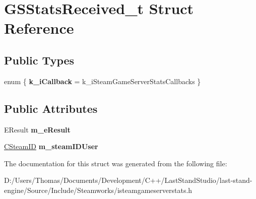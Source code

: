 \hypertarget{structGSStatsReceived__t}{}\section{G\+S\+Stats\+Received\+\_\+t Struct Reference}
\label{structGSStatsReceived__t}
\subsection*{Public Types}
\begin{DoxyCompactItemize}
\item 
\hypertarget{structGSStatsReceived__t_a9ee94659444c87a64fdf61d948a796bf}{}enum \{ {\bfseries k\+\_\+i\+Callback} = k\+\_\+i\+Steam\+Game\+Server\+Stats\+Callbacks
 \}\label{structGSStatsReceived__t_a9ee94659444c87a64fdf61d948a796bf}

\end{DoxyCompactItemize}
\subsection*{Public Attributes}
\begin{DoxyCompactItemize}
\item 
\hypertarget{structGSStatsReceived__t_a66bbf5b83de26013cbc96e6a9e06b01a}{}E\+Result {\bfseries m\+\_\+e\+Result}\label{structGSStatsReceived__t_a66bbf5b83de26013cbc96e6a9e06b01a}

\item 
\hypertarget{structGSStatsReceived__t_ad44c9e2c30b7a5e804c1973075206303}{}\hyperlink{classCSteamID}{C\+Steam\+I\+D} {\bfseries m\+\_\+steam\+I\+D\+User}\label{structGSStatsReceived__t_ad44c9e2c30b7a5e804c1973075206303}

\end{DoxyCompactItemize}


The documentation for this struct was generated from the following file\+:\begin{DoxyCompactItemize}
\item 
D\+:/\+Users/\+Thomas/\+Documents/\+Development/\+C++/\+Last\+Stand\+Studio/last-\/stand-\/engine/\+Source/\+Include/\+Steamworks/isteamgameserverstats.\+h\end{DoxyCompactItemize}
